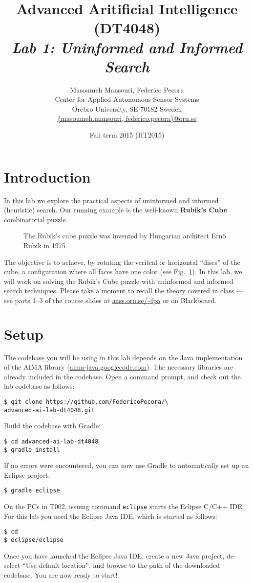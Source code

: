 \documentclass[a4paper]{article}
\title{Advanced Aritificial Intelligence (DT4048)\\{\em Lab 1: Uninformed and Informed Search}}
\author{Masoumeh Mansouri, Federico Pecora\\Center for Applied Autonomous Sensor Systems\\\"Orebro University, SE-70182 Sweden\\\url{{masoumeh.mansouri, federico.pecora}@oru.se}}
\date{Fall term 2015 (HT2015)}
\begin{document}
\maketitle

\section{Introduction}

In this lab we explore the practical aspects of uninformed and informed (heuristic) search.  Our running example is the well-known {\bf Rubik's Cube} combinatorial puzzle.
\begin{figure}[!ht]
\centering

\caption{{\small The Rubik's cube puzzle was invented by Hungarian architect Ern\H{o} Rubik in 1975.}}
\label{fig:rc}
\end{figure}
The objective is to achieve, by rotating the veritcal or horizontal ``discs'' of the cube, a configuration where all faces have one color (see Fig.~\ref{fig:rc}).  In this lab, we will work on solving the Rubik's Cube puzzle with uninformed and informed search techniques.  Please take a moment to recall the theory covered in class --- see parts 1--3 of the course slides at \url{aass.oru.se/~fpa} or on Blackboard.

\section{Setup}
The codebase you will be using in this lab depends on the Java implementation of the AIMA library (\url{aima-java.googlecode.com}).  The necessary libraries are already included in the codebase.
Open a command prompt, and check out the lab codebase as follows:
\begin{lstlisting}
$ git clone https://github.com/FedericoPecora/\
advanced-ai-lab-dt4048.git
\end{lstlisting}
Build the codebase with Gradle:
\begin{lstlisting}
$ cd advanced-ai-lab-dt4048
$ gradle install
\end{lstlisting}
If no errors were encountered, you can now use Gradle to automatically set up an Eclipse project:
\begin{lstlisting}
$ gradle eclipse
\end{lstlisting}
On the PCs in T002, issuing command {\tt eclipse} starts the Eclipse C/C++ IDE.  For this lab you need the Eclipse Java IDE, which is started as follows:
\begin{lstlisting}
$ cd
$ eclipse/eclipse
\end{lstlisting}
Once you have launched the Eclipse Java IDE, create a new Java project, de-select ``Use default location'', and browse to the path of the downloaded codebase. You are now ready to start!
\end{document}
